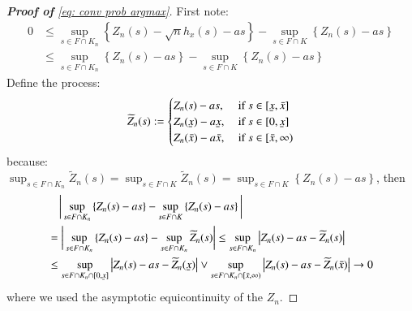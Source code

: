 \begin{proof}[\hypertarget{proof of lemma conv prob}{\textbf{Proof of}} \eqref{eq: conv prob argmax}]
First note:
\begin{align*}
    0 &\leq \sup_{s \in F \cap K_n} \left\{Z_n(s) - \sqrt{n} h_x(s) -as\right\} - \sup_{s \in F \cap K} \left\{Z_n(s) -as\right\} \\
    & \leq \sup_{s \in F \cap K_n} \left\{Z_n(s) -as\right\} - \sup_{s \in F \cap K} \left\{Z_n(s) -as\right\}
\end{align*}
Define the process:
\begin{align*}
    \widetilde{Z}_n(s) := \begin{cases}{Z_n(s)-as,} & \text { if } s \in [\ubar{x},\bar{x}] \\ Z_n(\ubar{x})-a\ubar{x}, & \text { if } s \in [0,\ubar{x}] \\ Z_n(\bar{x})-a\bar{x}, & \text { if } s \in [\bar{x},\infty) \end{cases}
\end{align*}
because: $\sup_{s \in F \cap K_n} \widetilde{Z}_n(s) = \sup_{s \in F \cap K}  \widetilde{Z}_n(s) = \sup_{s \in F \cap K} \left\{Z_n(s) -as\right\}$, then
\begin{align*}
    &\quad \bigg| \sup_{s \in F \cap K_n} \left\{Z_n(s) -as\right\} - \sup_{s \in F \cap K} \left\{Z_n(s) -as\right\} \bigg| \\
    &= \bigg| \sup_{s \in F \cap K_n} \left\{Z_n(s) -as\right\} - \sup_{s \in F \cap K_n} \widetilde{Z}_n(s) \bigg| \leq \sup_{s \in F \cap K_n} \big| Z_n(s) - as - \widetilde{Z}_n(s) \big| \\
    & \leq \sup_{s \in F \cap K_n \cap [0,\ubar{x}]} \big| Z_n(s) - as - \widetilde{Z}_n(\ubar{x}) \big| \vee \sup_{s \in F \cap K_n \cap [\bar{x},\infty)} \big| Z_n(s) - as - \widetilde{Z}_n(\bar{x}) \big| \rightarrow 0
\end{align*}
where we used the asymptotic equicontinuity of the $Z_n$.
\end{proof}

